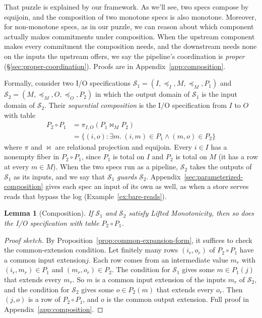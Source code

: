 \documentclass[sigconf]{cidr-2027}
\newtheorem{lemma}{Lemma}
\theoremstyle{remark}
\newcommand{\InputOrd}{\preceq_I}
\newcommand{\OutputOrd}{\preceq_O}
\newcommand{\commitment}{commitment\xspace}
\newcommand{\commitments}{commitments\xspace}
\newcommand{\indesc}{input extension\xspace} %
\newcommand{\outrel}{extends\xspace}          %
\newcommand{\outnoun}{output extension\xspace}%
\newcommand{\Spec}{\mathcal{S}}
\newcommand{\spectype}[1][]{I/O specification#1\xspace}
\begin{document}
That puzzle is explained by our framework.  As we'll see, two specs compose by equijoin,
and the composition of two monotone specs is also monotone. Moreover, for non-monotone specs,
as in our puzzle, we
can reason about which component actually makes \commitments under composition.  When the
upstream component makes every \commitment the composition needs, and the
downstream needs none on the inputs the upstream offers, we say the pipeline's
coordination is \emph{proper}
(\S\ref{sec:proper-coordination}).  Proofs are in
Appendix~\ref{app:composition}.
\label{sec:sequential-composition}

Formally, consider two \spectype[s]
${\Spec_1=(I,\InputOrd,M,\preceq_M,P_1)}$ and
${\Spec_2=(M,\preceq_M,O,\OutputOrd,P_2)}$
in which the output domain of $\Spec_1$ is the input domain of $\Spec_2$.  Their
\emph{sequential composition} is the \spectype from $I$ to $O$ with table
\begin{equation}
\begin{split}
  P_2\circ P_1
  &=\pi_{I,O}(P_1\Join_M P_2)\\
  &=\{(i,o):\exists m.\ (i,m)\in P_1\land(m,o)\in P_2\}
\end{split}
  \label{eq:spec-composition}
\end{equation}
where $\pi$ and $\Join$ are relational projection and equijoin.  Every $i\in I$
has a nonempty fiber in $P_2\circ P_1$, since $P_1$ is total on $I$ and $P_2$ is
total on $M$ (it has a row at every $m\in M$).  When the two specs run as a
pipeline, $\Spec_2$ takes the outputs of $\Spec_1$ as its inputs, and
we say that $\Spec_1$ \emph{guards} $\Spec_2$.
Appendix~\ref{sec:parameterized-composition} gives each spec an input of its
own as well, as when a store serves reads that bypass the log
(Example~\ref{ex:bare-reads}).

\begin{lemma}[Composition]
\label{lem:composition}
If $\Spec_1$ and $\Spec_2$ satisfy Lifted Monotonicity, then so does the \spectype with table $P_2\circ P_1$.
\end{lemma}

\begin{proof}[Proof sketch]
By Proposition~\ref{prop:common-expansion-form}, it suffices to check the
common-extension condition.  Let finitely many rows $(i_r,o_r)$ of
$P_2\circ P_1$ have a common \indesc $j$.  Each row comes from an intermediate
value $m_r$ with $(i_r,m_r)\in P_1$ and $(m_r,o_r)\in P_2$.  The condition for
$\Spec_1$ gives some $m\in P_1(j)$ that \outrel every $m_r$.  So $m$ is a
common \indesc of the inputs $m_r$ of $\Spec_2$, and the condition for
$\Spec_2$ gives some $o\in P_2(m)$ that \outrel every $o_r$.  Then $(j,o)$ is a
row of $P_2\circ P_1$, and $o$ is the common \outnoun.  Full proof
in Appendix~\ref{app:composition}.
\end{proof}
\end{document}
